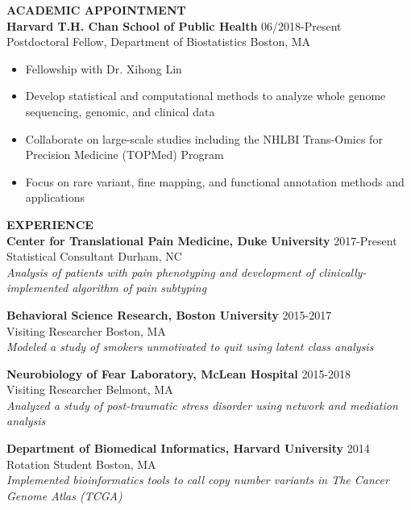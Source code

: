 \documentclass[10pt]{article}
\begin{document}
\vspace{0.3cm}


{\bf ACADEMIC APPOINTMENT} \hrulefill \\

\textbf{Harvard T.H. Chan School of Public Health} \hfill 06/2018-Present\\
\indent Postdoctoral Fellow, Department of Biostatistics \hfill Boston, MA
\begin{itemize}
	\item Fellowship with Dr. Xihong Lin
	\item Develop statistical and computational methods to analyze whole genome sequencing, genomic, and clinical data
	\item Collaborate on large-scale studies including the NHLBI Trans-Omics for Precision Medicine (TOPMed) Program
	\item Focus on rare variant, fine mapping, and functional annotation methods and applications \\
\end{itemize}

\vspace{0.3cm}

{ \bf EXPERIENCE} \hrulefill \\

\textbf{Center for Translational Pain Medicine, Duke University} \hfill 2017-Present\\
\indent Statistical Consultant  \hfill Durham, NC\\
\indent \textit{Analysis of patients with pain phenotyping and development of clinically-implemented algorithm of pain subtyping \\}

\textbf{Behavioral Science Research, Boston University} \hfill 2015-2017\\
\indent Visiting Researcher \hfill Boston, MA\\
\indent \textit{Modeled a study of smokers unmotivated to quit using latent class analysis  \\}

\textbf{Neurobiology of Fear Laboratory, McLean Hospital} \hfill 2015-2018\\
\indent Visiting Researcher \hfill Belmont, MA\\
\indent \textit{Analyzed a study of post-traumatic stress disorder using network and mediation analysis \\}

\textbf{Department of Biomedical Informatics, Harvard University} \hfill 2014\\
\indent Rotation Student \hfill Boston, MA\\
\indent \textit{Implemented bioinformatics tools to call copy number variants in The Cancer Genome Atlas (TCGA)  \\}
\end{document}
